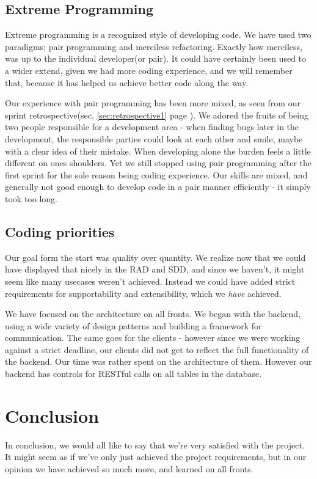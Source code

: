 \section{Extreme Programming}
Extreme programming is a recognized style of developing code. We have used two paradigms; pair programming and merciless refactoring. Exactly how merciless, was up to the individual developer(or pair). It could have certainly been used to a wider extend, given we had more coding experience, and we will remember that, because it has helped us achieve better code along the way.

Our experience with pair programming has been more mixed, as seen from our sprint retrospective(sec. \ref{sec:retrospective1} page \pageref{sec:retrospective1}). We adored the fruits of being two people responsible for a development area - when finding bugs later in the development, the responsible parties could look at each other and smile, maybe with a clear idea of their mistake. When developing alone the burden feels a little different on ones shoulders. Yet we still stopped using pair programming after the first sprint for the sole reason being coding experience. Our skills are mixed, and generally not good enough to develop code in a pair manner efficiently - it simply took too long. 

\section{Coding priorities}
Our goal form the start was quality over quantity. We realize now that we could have displayed that nicely in the RAD and SDD, and since we haven't, it might seem like many usecases weren't achieved. Instead we could have added strict requirements for supportability and extensibility, which we \textit{have} achieved.


We have focused on the architecture on all fronts. We began with the backend, using a wide variety of design patterns and building a framework for communication. The same goes for the clients - however since we were working against a strict deadline, our clients did not get to reflect the full functionality of the backend. Our time was rather spent on the architecture of them. However our backend has controls for RESTful calls on all tables in the database. 


\chapter{Conclusion}
\label{chap:Conclusion}
In conclusion, we would all like to say that we're very satisfied with the project. It might seem as if we've only just achieved the project requirements, but in our opinion we have achieved so much more, and learned on all fronts.

